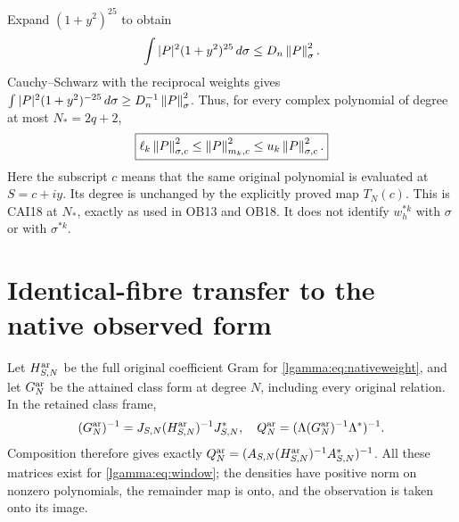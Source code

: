 Expand $(1+y^2)^{25}$ to obtain
\[
 \int|P|^2(1+y^2)^{25}\,d\sigma\le D_n\left\lVert P\right\rVert_\sigma^2.
\]
Cauchy--Schwarz with the reciprocal weights gives
$\int|P|^2(1+y^2)^{-25}\,d\sigma\ge D_n^{-1}\left\lVert P\right\rVert_\sigma^2$.
Thus, for every complex polynomial of degree at most $N_*=2q+2$,
\begin{equation}\label{lgamma:eq:nativecomparison}
 \boxed{\ell_k\left\lVert P\right\rVert_{\sigma,c}^{2}
       \le\left\lVert P\right\rVert_{m_k,c}^{2}
       \le u_k\left\lVert P\right\rVert_{\sigma,c}^{2}.}
\end{equation}
Here the subscript $c$ means that the same original polynomial is
evaluated at $S=c+iy$.  Its degree is unchanged by the explicitly
proved map $T_N(c)$.  This is CAI18 at $N_*$, exactly as used in
OB13 and OB18.  It does not identify $w_h^{*k}$ with $\sigma$ or with
$\sigma^{*k}$.

\section{Identical-fibre transfer to the native observed form}

Let $H_{S,N}^{\rm ar}$ be the full original coefficient Gram for
\eqref{lgamma:eq:nativeweight}, and let $G_N^{\rm ar}$ be the attained class
form at degree $N$, including every original relation.  In the retained
class frame,
\[
 (G_N^{\rm ar})^{-1}
 =J_{S,N}(H_{S,N}^{\rm ar})^{-1}J_{S,N}^*,\quad
 Q_N^{\rm ar}=(\Lambda(G_N^{\rm ar})^{-1}\Lambda^*)^{-1}.
\]
Composition therefore gives exactly
$Q_N^{\rm ar}=(A_{S,N}(H_{S,N}^{\rm ar})^{-1}A_{S,N}^*)^{-1}$.
All these matrices exist for \eqref{lgamma:eq:window}; the densities have
positive norm on nonzero polynomials, the remainder map is onto, and
the observation is taken onto its image.

